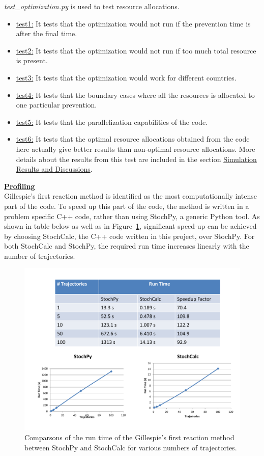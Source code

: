 \documentclass[11pt,letter]{article}
\begin{document}
\emph{test\_optimization.py} is used to test resource allocations.
\begin{itemize}

\item \underline{test1:} It tests that the optimization would not run if the prevention time is after the final time.
\item \underline{test2:} It tests that the optimization would not run if too much total resource is present.
\item \underline{test3:} It tests that the optimization would work for different countries.
\item \underline{test4:} It tests that the boundary cases where all the resources is allocated to one particular prevention.
\item \underline{test5:} It tests that the parallelization capabilities of the code.
\item \underline{test6:} It tests that the optimal resource allocations obtained from the code here actually give better results than non-optimal resource allocations. More details about the results from this test are included in the section \underline{Simulation Results and Discussions}.
\end{itemize}

\underline{\textbf{Profiling}}\vspace{0.5mm}\\

Gillespie's first reaction method is identified as the most computationally intense part of the code. To speed up this part of the code, the method is written in a problem specific C++ code, rather than using StochPy, a generic Python tool. As shown in table below as well as in Figure~\ref{speed_up}, significant speed-up can be achieved by choosing StochCalc, the C++ code written in this project, over StochPy. For both StochCalc and StochPy, the required run time increases linearly with the number of trajectories. \\

 \begin{figure}[t]
\centering
\includegraphics[width=16cm]{speed_up.pdf}
\caption{Comparsons of the run time of the Gillespie's first reaction method between StochPy and StochCalc for various numbers of trajectories.
\label{speed_up}}
\end{figure}
\end{document}
